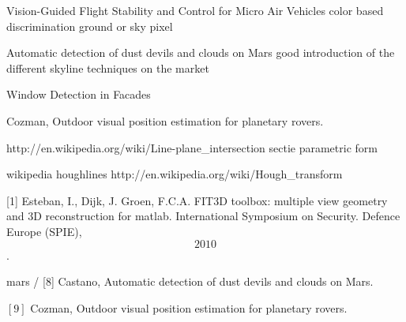 
Vision-Guided Flight Stability and Control for Micro Air Vehicles
	color based discrimination ground or sky pixel

Automatic detection of dust devils and clouds on Mars
	good introduction of the different skyline techniques on the market

Window Detection in Facades

Cozman, Outdoor visual position estimation for planetary rovers.

http://en.wikipedia.org/wiki/Line-plane_intersection
sectie parametric form

wikipedia houghlines
	http://en.wikipedia.org/wiki/Hough_transform



[1]
Esteban, I., Dijk, J. Groen, F.C.A. FIT3D toolbox: multiple view geometry and
3D reconstruction for matlab. International Symposium on Security. Defence
Europe (SPIE), \[2010\].



{mars} / [8]
Castano, Automatic detection of dust devils and clouds on Mars.
\item $[9]$ Cozman, Outdoor visual position estimation for planetary rovers.

